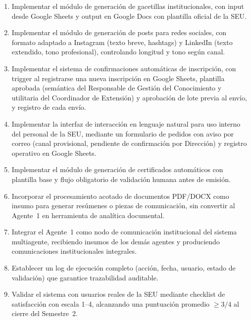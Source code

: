 \documentclass[a4paper, 12pt]{article}
\begin{document}
\begin{enumerate}[label=OE\arabic*.]
  \item Implementar el m\'odulo de generaci\'on de gacetillas institucionales, con input desde Google Sheets y output en Google Docs con plantilla oficial de la \ac{SEU}.
  \item Implementar el m\'odulo de generaci\'on de posts para redes sociales, con formato adaptado a Instagram (texto breve, hashtags) y LinkedIn (texto extendido, tono profesional), controlando longitud y tono seg\'un canal.
  \item Implementar el sistema de confirmaciones autom\'aticas de inscripci\'on, con trigger al registrarse una nueva inscripci\'on en Google Sheets, plantilla aprobada (sem\'antica del Responsable de Gesti\'on del Conocimiento y utilitaria del Coordinador de Extensi\'on) y aprobaci\'on de lote previa al env\'io, y registro de cada env\'io.
  \item Implementar la interfaz de interacci\'on en lenguaje natural para uso interno del personal de la \ac{SEU}, mediante un formulario de pedidos con aviso por correo (canal provisional, pendiente de confirmaci\'on por Direcci\'on) y registro operativo en Google Sheets.
  \item Implementar el m\'odulo de generaci\'on de certificados autom\'aticos con plantilla base y flujo obligatorio de validaci\'on humana antes de emisi\'on.
  \item Incorporar el procesamiento acotado de documentos PDF/DOCX como insumo para generar res\'umenes o piezas de comunicaci\'on, sin convertir al Agente~1 en herramienta de anal\'itica documental.
  \item Integrar el Agente~1 como nodo de comunicaci\'on institucional del sistema multiagente, recibiendo insumos de los dem\'as agentes y produciendo comunicaciones institucionales integrales.
  \item Establecer un log de ejecuci\'on completo (acci\'on, fecha, usuario, estado de validaci\'on) que garantice trazabilidad auditable.
  \item Validar el sistema con usuarios reales de la \ac{SEU} mediante checklist de satisfacci\'on con escala 1--4, alcanzando una puntuaci\'on promedio $\geq 3/4$ al cierre del Semestre~2.
\end{enumerate}

\end{document}
